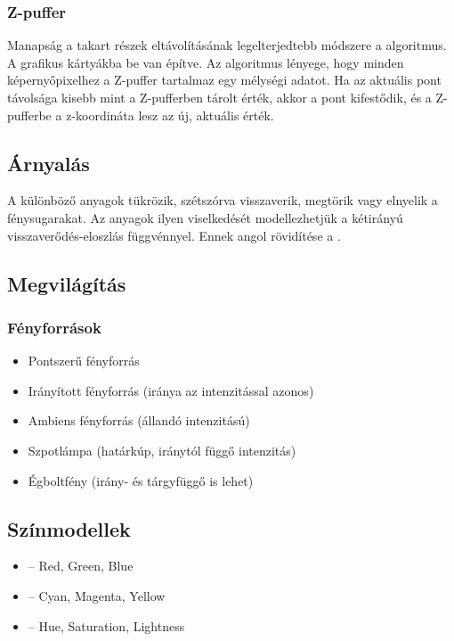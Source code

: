 \documentclass[../../main.tex]{subfiles}
\begin{document}
\subsubsection{Z-puffer}

Manapság a takart részek eltávolításának legelterjedtebb módszere a
 algoritmus. A grafikus kártyákba be van építve.
Az algoritmus lényege, hogy minden képernyőpixelhez a Z-puffer tartalmaz
egy mélységi adatot. Ha az aktuális pont távolsága kisebb mint a Z-pufferben
tárolt érték, akkor a pont kifestődik, és a Z-pufferbe a z-koordináta lesz az
új, aktuális érték.

\subsection{Árnyalás}

A különböző anyagok tükrözik, szétszórva visszaverik, megtörik vagy elnyelik a
fénysugarakat. Az anyagok ilyen viselkedését modellezhetjük a kétirányú
visszaverődés-eloszlás függvénnyel. Ennek angol rövidítése a .

\subsection{Megvilágítás}

\subsubsection{Fényforrások}

\begin{itemize}
  \item Pontszerű fényforrás
  \item Irányított fényforrás (iránya az intenzitással azonos)
  \item Ambiens fényforrás (állandó intenzitású)
  \item Szpotlámpa (határkúp, iránytól függő intenzitás)
  \item Égboltfény (irány- és tárgyfüggő is lehet)
\end{itemize}

\subsection{Színmodellek}

\begin{itemize}
  \item {} -- Red, Green, Blue
  \item {} -- Cyan, Magenta, Yellow
  \item {} -- Hue, Saturation, Lightness
\end{itemize}
\end{document}
